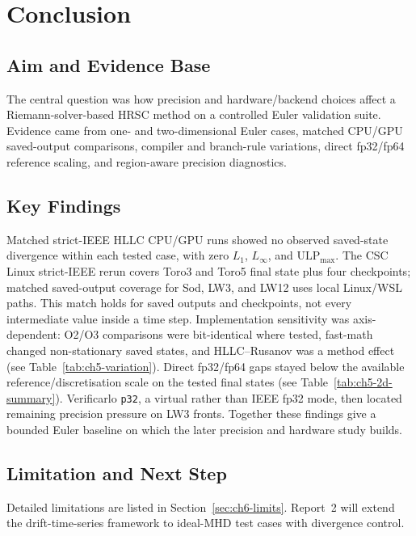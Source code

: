 
\chapter{Conclusion}

\section{Aim and Evidence Base}
The central question was how precision and hardware/backend choices affect a Riemann-solver-based HRSC method on a controlled Euler validation suite. Evidence came from one- and two-dimensional Euler cases, matched CPU/GPU saved-output comparisons, compiler and branch-rule variations, direct fp32/fp64 reference scaling, and region-aware precision diagnostics.

\section{Key Findings}
Matched strict-IEEE HLLC CPU/GPU runs showed no observed saved-state divergence within each tested case, with zero \(L_1\), \(L_\infty\), and \(\mathrm{ULP}_{\max}\). The CSC Linux strict-IEEE rerun covers Toro3 and Toro5 final state plus four checkpoints; matched saved-output coverage for Sod, LW3, and LW12 uses local Linux/WSL paths. This match holds for saved outputs and checkpoints, not every intermediate value inside a time step. Implementation sensitivity was axis-dependent: O2/O3 comparisons were bit-identical where tested, fast-math changed non-stationary saved states, and HLLC--Rusanov was a method effect (see Table~\ref{tab:ch5-variation}). Direct fp32/fp64 gaps stayed below the available reference/discretisation scale on the tested final states (see Table~\ref{tab:ch5-2d-summary}). Verificarlo \texttt{p32}, a virtual rather than IEEE fp32 mode, then located remaining precision pressure on LW3 fronts. Together these findings give a bounded Euler baseline on which the later precision and hardware study builds.

\section{Limitation and Next Step}
Detailed limitations are listed in Section~\ref{sec:ch6-limits}. Report~2 will extend the drift-time-series framework to ideal-MHD test cases with divergence control.
